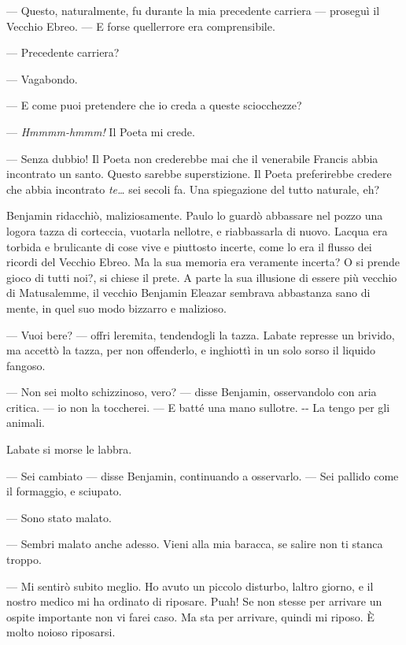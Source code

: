 --- Questo, naturalmente, fu durante la mia precedente carriera ---
proseguì il Vecchio Ebreo. --- E forse quell\textquotesingle errore era
comprensibile.

--- Precedente carriera?

--- Vagabondo.

--- E come puoi pretendere che io creda a queste sciocchezze?

--- \emph{Hmmmm-hmmm!} Il Poeta mi crede.

--- Senza dubbio! Il Poeta non crederebbe mai che il venerabile Francis
abbia incontrato un santo. Questo sarebbe superstizione. Il Poeta
preferirebbe credere che abbia incontrato \emph{te\ldots{}} sei secoli
fa. Una spiegazione del tutto naturale, eh?

Benjamin ridacchiò, maliziosamente. Paulo lo guardò abbassare nel pozzo
una logora tazza di corteccia, vuotarla nell\textquotesingle otre, e
riabbassarla di nuovo. L\textquotesingle acqua era torbida e brulicante
di cose vive e piuttosto incerte, come lo era il flusso dei ricordi del
Vecchio Ebreo. Ma la sua memoria era veramente incerta? O si prende
gioco di tutti noi?, si chiese il prete. A parte la sua illusione di
essere più vecchio di Matusalemme, il vecchio Benjamin Eleazar sembrava
abbastanza sano di mente, in quel suo modo bizzarro e malizioso.

--- Vuoi bere? --- offri l\textquotesingle eremita, tendendogli la
tazza. L\textquotesingle abate represse un brivido, ma accettò la tazza,
per non offenderlo, e inghiottì in un solo sorso il liquido fangoso.

--- Non sei molto schizzinoso, vero? --- disse Benjamin, osservandolo
con aria critica. --- io non la toccherei. --- E batté una mano
sull\textquotesingle otre. -\/- La tengo per gli animali.

L\textquotesingle abate si morse le labbra.

--- Sei cambiato --- disse Benjamin, continuando a osservarlo. --- Sei
pallido come il formaggio, e sciupato.

--- Sono stato malato.

--- Sembri malato anche adesso. Vieni alla mia baracca, se salire non ti
stanca troppo.

--- Mi sentirò subito meglio. Ho avuto un piccolo disturbo,
l\textquotesingle altro giorno, e il nostro medico mi ha ordinato di
riposare. Puah! Se non stesse per arrivare un ospite importante non vi
farei caso. Ma sta per arrivare, quindi mi riposo. È molto noioso
riposarsi.

